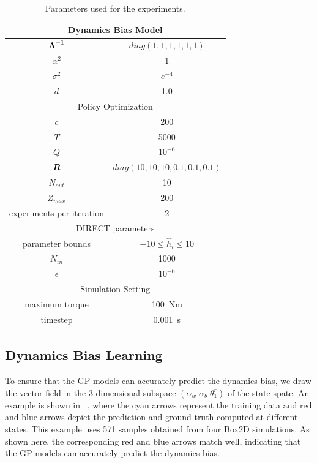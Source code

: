 \documentclass[letterpaper, 10 pt, conference]{ieeeconf}
\begin{document}
\begin{table}
\begin{center}
\caption{Parameters used for the experiments.} \label{tab:learning_parameters}
\begin{tabular}{c|c}
\hline
\multicolumn{2}{c}{Dynamics Bias Model}\\\hline
$\mbox{\boldmath \(\Lambda\)}^{-1}$ & $diag(1, 1, 1, 1, 1, 1)$\\
$\alpha^2$ & 1\\
$\sigma^2$ & $e^{-4}$\\
$d$ & 1.0\\\hline
\multicolumn{2}{c}{Policy Optimization}\\\hline
$c$ & 200\\
$T$ & 5000\\
$Q$ & $10^{-6}$\\
$\mbox{\boldmath \(R\)}$ & $diag(10, 10, 10, 0.1, 0.1, 0.1)$\\
$N_{out}$ & 10\\
$Z_{max}$ & 200\\
experiments per iteration & 2\\\hline
\multicolumn{2}{c}{DIRECT parameters}\\\hline
parameter bounds & $-10 \leq \hat{h}_i \leq 10$\\
$N_{in}$ & 1000\\
$\epsilon$ & $10^{-6}$\\\hline
\multicolumn{2}{c}{Simulation Setting}\\\hline
maximum torque & 100~Nm\\
timestep & 0.001~s\\
\hline
\end{tabular}
\end{center}
\end{table}

\subsection{Dynamics Bias Learning}

To ensure that the GP models can accurately predict the dynamics bias, we
draw the vector field in the 3-dimensional subspace 
$(\alpha_w\;\alpha_b\;\theta_1^r)$ of the state spate.
An example is shown in ~, where 
the cyan arrows represent the training data and 
red and blue arrows depict the prediction and ground truth computed
at different states.
This example uses 571 samples obtained from four Box2D simulations.
As shown here, the corresponding red and blue arrows match well,
indicating that the GP models can accurately predict the dynamics bias.
\end{document}
